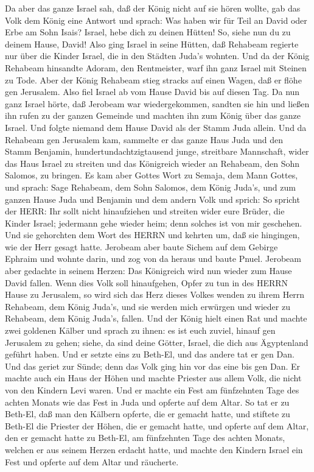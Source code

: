 Da aber das ganze Israel sah, daß der König nicht auf sie hören wollte,
gab das Volk dem König eine Antwort und sprach: Was haben wir für Teil
an David oder Erbe am Sohn Isais? Israel, hebe dich zu deinen Hütten!
So, siehe nun du zu deinem Hause, David! Also ging Israel in seine
Hütten,  daß Rehabeam regierte nur über die Kinder Israel,
die in den Städten Juda's wohnten.  Und da der König
Rehabeam hinsandte Adoram, den Rentmeister, warf ihn ganz Israel mit
Steinen zu Tode. Aber der König Rehabeam stieg stracks auf einen Wagen,
daß er flöhe gen Jerusalem.  Also fiel Israel ab vom Hause
David bis auf diesen Tag.  Da nun ganz Israel hörte, daß
Jerobeam war wiedergekommen, sandten sie hin und ließen ihn rufen zu der
ganzen Gemeinde und machten ihn zum König über das ganze Israel. Und
folgte niemand dem Hause David als der Stamm Juda allein. 
Und da Rehabeam gen Jerusalem kam, sammelte er das ganze Haus Juda und
den Stamm Benjamin, hundertundachtzigtausend junge, streitbare
Mannschaft, wider das Haus Israel zu streiten und das Königreich wieder
an Rehabeam, den Sohn Salomos, zu bringen.  Es kam aber
Gottes Wort zu Semaja, dem Mann Gottes, und sprach:  Sage
Rehabeam, dem Sohn Salomos, dem König Juda's, und zum ganzen Hause Juda
und Benjamin und dem andern Volk und sprich:  So spricht
der HERR: Ihr sollt nicht hinaufziehen und streiten wider eure Brüder,
die Kinder Israel; jedermann gehe wieder heim; denn solches ist von mir
geschehen. Und sie gehorchten dem Wort des HERRN und kehrten um, daß sie
hingingen, wie der Herr gesagt hatte.  Jerobeam aber baute
Sichem auf dem Gebirge Ephraim und wohnte darin, und zog von da heraus
und baute Pnuel.  Jerobeam aber gedachte in seinem Herzen:
Das Königreich wird nun wieder zum Hause David fallen. 
Wenn dies Volk soll hinaufgehen, Opfer zu tun in des HERRN Hause zu
Jerusalem, so wird sich das Herz dieses Volkes wenden zu ihrem Herrn
Rehabeam, dem König Juda's, und sie werden mich erwürgen und wieder zu
Rehabeam, dem König Juda's, fallen.  Und der König hielt
einen Rat und machte zwei goldenen Kälber und sprach zu ihnen: es ist
euch zuviel, hinauf gen Jerusalem zu gehen; siehe, da sind deine Götter,
Israel, die dich aus Ägyptenland geführt haben.  Und er
setzte eins zu Beth-El, und das andere tat er gen Dan.  Und
das geriet zur Sünde; denn das Volk ging hin vor das eine bis gen Dan.
 Er machte auch ein Haus der Höhen und machte Priester aus
allem Volk, die nicht von den Kindern Levi waren.  Und er
machte ein Fest am fünfzehnten Tage des achten Monats wie das Fest in
Juda und opferte auf dem Altar. So tat er zu Beth-El, daß man den
Kälbern opferte, die er gemacht hatte, und stiftete zu Beth-El die
Priester der Höhen, die er gemacht hatte,  und opferte auf
dem Altar, den er gemacht hatte zu Beth-El, am fünfzehnten Tage des
achten Monats, welchen er aus seinem Herzen erdacht hatte, und machte
den Kindern Israel ein Fest und opferte auf dem Altar und räucherte.

